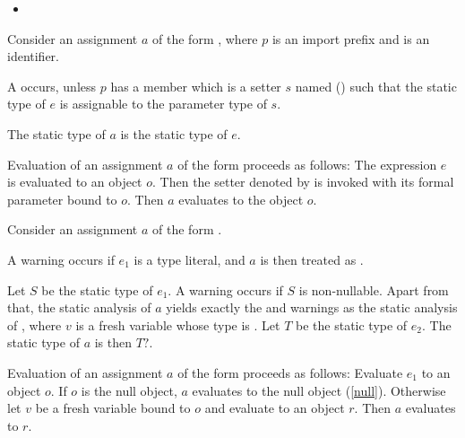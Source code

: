 \documentclass[makeidx]{article}
\begin{document}
{\begin{itemize}
\item
\end{itemize}
\EndCase

\LMHash{}%
Consider an assignment $a$ of the form ,
where $p$ is an import prefix and \id{} is an identifier.

\LMHash{}%
A  occurs,
unless $p$ has a member which is a setter $s$ named 
()
such that the static type of $e$
is assignable to the parameter type of $s$.

\LMHash{}%
The static type of $a$ is the static type of $e$.

\LMHash{}%
Evaluation of an assignment $a$ of the form 
proceeds as follows:
The expression $e$ is evaluated to an object $o$.
Then the setter denoted by  is invoked
with its formal parameter bound to $o$.
Then $a$ evaluates to the object $o$.
\EndCase

\LMHash{}%
Consider an assignment $a$ of the form .

\LMHash{}%
A warning occurs if $e_1$ is a type literal,
and $a$ is then treated as .

\LMHash{}%
Let $S$ be the static type of $e_1$.
A warning occurs if $S$ is non-nullable.
Apart from that,
the static analysis of $a$ yields
exactly the  and warnings as
the static analysis of ,
where $v$ is a fresh variable whose type is .
Let $T$ be the static type of $e_2$.
The static type of $a$ is then $T?$.

\LMHash{}%
Evaluation of an assignment $a$ of the form 
proceeds as follows:
Evaluate $e_1$ to an object $o$.
If $o$ is the null object, $a$ evaluates to the null object (\ref{null}).
Otherwise let $v$ be a fresh variable bound to $o$
and evaluate  to an object $r$.
Then $a$ evaluates to $r$.
\EndCase

}
\end{document}
